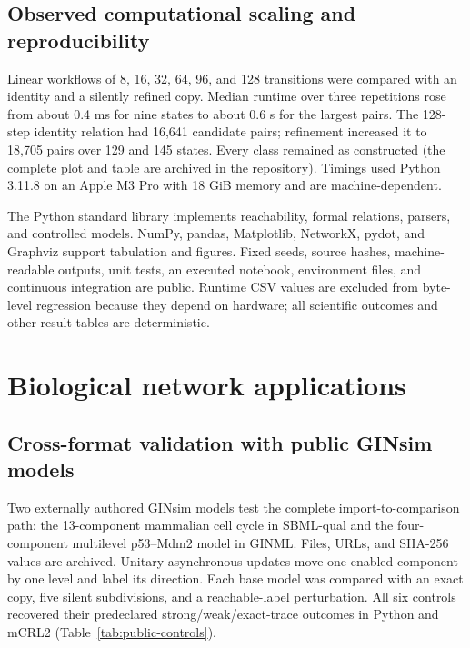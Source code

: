 \documentclass{ws-jbcb}
\numberwithin{equation}{section}
\begin{document}
\subsection{Observed computational scaling and reproducibility}
\label{sec:scalability-method}

Linear workflows of 8, 16, 32, 64, 96, and 128 transitions were compared with an
identity and a silently refined copy. Median runtime over three repetitions rose
from about 0.4 ms for nine states to about 0.6 s for the largest pairs. The
128-step identity relation had 16,641 candidate pairs; refinement increased it
to 18,705 pairs over 129 and 145 states. Every class remained as constructed
(the complete plot and table are archived in the repository). Timings used
Python 3.11.8 on an Apple M3 Pro with 18 GiB memory and are machine-dependent.

The Python standard library implements reachability, formal relations, parsers,
and controlled models. NumPy, pandas, Matplotlib, NetworkX, pydot, and Graphviz
support tabulation and figures. Fixed seeds, source hashes,
machine-readable outputs, unit tests, an executed notebook, environment files,
and continuous integration are public. Runtime CSV values are excluded from
byte-level regression because they depend on hardware; all scientific outcomes
and other result tables are deterministic.

\section{Biological network applications}
\label{sec:applications}

\subsection{Cross-format validation with public GINsim models}
\label{sec:public-method}

Two externally authored GINsim models test the complete import-to-comparison
path: the 13-component mammalian cell cycle in SBML-qual and the four-component
multilevel p53--Mdm2 model in GINML.\cite{Naldi2018,Traynard2016,
Chaouiya2013SBML,AbouJaoude2009} Files, URLs, and SHA-256 values are archived.
Unitary-asynchronous updates move one enabled component by one level and label
its direction. Each base model was compared with an exact copy, five silent
subdivisions, and a reachable-label perturbation. All six controls recovered
their predeclared strong/weak/exact-trace outcomes in Python and mCRL2
(Table~\ref{tab:public-controls}).
\end{document}
